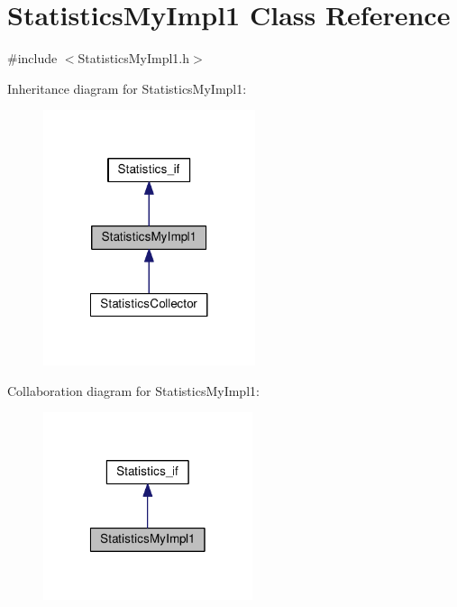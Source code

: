 \hypertarget{class_statistics_my_impl1}{\section{Statistics\-My\-Impl1 Class Reference}
\label{class_statistics_my_impl1}
}


{\ttfamily \#include $<$Statistics\-My\-Impl1.\-h$>$}



Inheritance diagram for Statistics\-My\-Impl1\-:
\nopagebreak
\begin{figure}[H]
\begin{center}
\leavevmode
\includegraphics[width=176pt]{class_statistics_my_impl1__inherit__graph}
\end{center}
\end{figure}


Collaboration diagram for Statistics\-My\-Impl1\-:
\nopagebreak
\begin{figure}[H]
\begin{center}
\leavevmode
\includegraphics[width=174pt]{class_statistics_my_impl1__coll__graph}
\end{center}
\end{figure}
